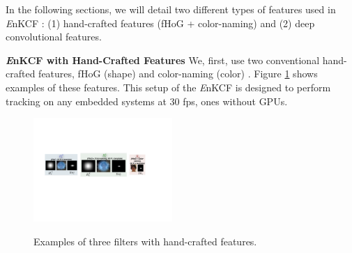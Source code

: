 \documentclass[10pt,twocolumn,letterpaper]{article}
\begin{document}
In the following sections, we will detail two different types of
features used in {\it E}nKCF : (1) hand-crafted features (fHoG +
color-naming) and (2) deep convolutional features.

\textbf{{\it E}nKCF with Hand-Crafted Features} We, first, use two
conventional hand-crafted features, fHoG (shape)
\cite{felzenszwalb2010object} and color-naming (color)
\cite{li2014scale}. Figure \ref{fig:Filters} shows examples of these
features. This setup of the {\it E}nKCF is designed to perform
tracking on any embedded systems at $30$ fps, ones without GPUs.
\begin{figure}[!h]
\centering
\includegraphics[width=0.47\textwidth]{./figures/Filters_Details.pdf}
   \\[-3ex]
\label{fig:Rt_S}
\quad{}\label{fig:Rt_L}
\quad\quad{}\label{fig:Rs}
\caption{Examples of three filters with hand-crafted features.}
\label{fig:Filters}
\end{figure}
\end{document}
